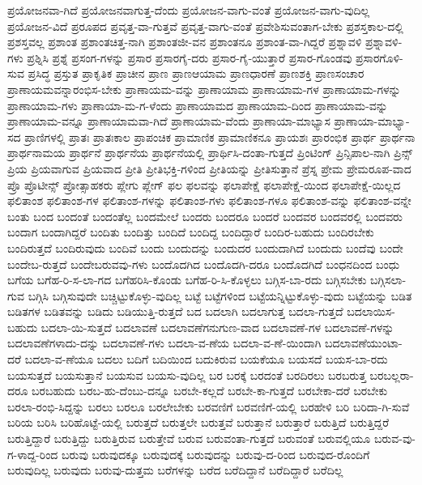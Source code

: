 {ಪ್ರಯೋಜನವಾ-ಗಿದೆ
ಪ್ರಯೋಜನವಾಗುತ್ತ-ದೆಂದು
ಪ್ರಯೋಜನ-ವಾಗು-ವಂತೆ
ಪ್ರಯೋಜನ-ವಾಗು-ವುದಿಲ್ಲ
ಪ್ರಯೋಜನ-ವಿದೆ
ಪ್ರರೂಪದ
ಪ್ರವೃತ್ತ-ವಾ-ಗುತ್ತವೆ
ಪ್ರವೃತ್ತ-ವಾಗು-ವಂತೆ
ಪ್ರವೇಶಿಸುವಂತಾಗ-ಬೇಕು
ಪ್ರಶಸ್ತಕಾಲ-ದಲ್ಲಿ
ಪ್ರಶಸ್ತವಲ್ಲ
ಪ್ರಶಾಂತ
ಪ್ರಶಾಂತಚಿತ್ತ-ನಾಗಿ
ಪ್ರಶಾಂತಜೀ-ವನ
ಪ್ರಶಾಂತನೂ
ಪ್ರಶಾಂತ-ವಾ-ಗಿದ್ದರೆ
ಪ್ರಶ್ನಾವಳಿ
ಪ್ರಶ್ನಾವಳಿ-ಗಳು
ಪ್ರಶ್ನಿಸಿ
ಪ್ರಶ್ನೆ
ಪ್ರಸಂಗ-ಗಳನ್ನು
ಪ್ರಸಾರ
ಪ್ರಸಾರಗೈ-ದರು
ಪ್ರಸಾರ-ಗೈ-ಯುತ್ತಾರೆ
ಪ್ರಸಾರ-ಗೊಂಡವು
ಪ್ರಸಾರಗೊಳಿ-ಸುವ
ಪ್ರಸಿದ್ಧ
ಪ್ರಸ್ತುತ
ಪ್ರಾಕೃತಿಕ
ಪ್ರಾಚೀನ
ಪ್ರಾಣ
ಪ್ರಾಣಆಯಾಮ
ಪ್ರಾಣಧಾರಣೆ
ಪ್ರಾಣಶಕ್ತಿ
ಪ್ರಾಣಸಂಚಾರ
ಪ್ರಾಣಾಯಮವನ್ನಾರಂಭಿಸ-ಬೇಕು
ಪ್ರಾಣಾಯಮ-ವನ್ನು
ಪ್ರಾಣಾಯಾಮ
ಪ್ರಾಣಾಯಾಮ-ಗಳ
ಪ್ರಾಣಾಯಾಮ-ಗಳನ್ನು
ಪ್ರಾಣಾಯಾಮ-ಗಳು
ಪ್ರಾಣಾಯಾ-ಮ-ಗ-ಳೆಂದು
ಪ್ರಾಣಾಯಾಮದ
ಪ್ರಾಣಾಯಾಮ-ದಿಂದ
ಪ್ರಾಣಾಯಾಮ-ವನ್ನು
ಪ್ರಾಣಾಯಾಮ-ವನ್ನೂ
ಪ್ರಾಣಾಯಾಮವಾ-ಗಿದೆ
ಪ್ರಾಣಾಯಾಮ-ವೆಂದು
ಪ್ರಾಣಾಯಾ-ಮಾಭ್ಯಾಸ
ಪ್ರಾಣಾಯಾ-ಮಾಭ್ಯಾ-ಸದ
ಪ್ರಾಣಿಗಳಲ್ಲಿ
ಪ್ರಾತಃ
ಪ್ರಾತಃಕಾಲ
ಪ್ರಾಪಂಚಿಕ
ಪ್ರಾಮಾಣಿಕ
ಪ್ರಾಮಾಣಿಕನೂ
ಪ್ರಾಯಶಃ
ಪ್ರಾರಂಭಿಕ
ಪ್ರಾರ್ಥ
ಪ್ರಾರ್ಥನಾ
ಪ್ರಾರ್ಥನಾಮಯ
ಪ್ರಾರ್ಥನೆ
ಪ್ರಾರ್ಥನೆಯ
ಪ್ರಾರ್ಥನೆಯಲ್ಲಿ
ಪ್ರಾರ್ಥಿಸಿ-ದಂತಾ-ಗುತ್ತದೆ
ಪ್ರಿಂಟಿಂಗ್
ಪ್ರಿನ್ಸಿಪಾಲ-ನಾಗಿ
ಪ್ರಿನ್ಸ್
ಪ್ರಿಯ
ಪ್ರಿಯವಾಗುವ
ಪ್ರಿಯವಾದ
ಪ್ರೀತಿ
ಪ್ರೀತಿಭಕ್ತಿ-ಗಳಿಂದ
ಪ್ರೀತಿಯನ್ನು
ಪ್ರೀತಿಸುತ್ತಾನೆ
ಪ್ರೆಸ್ನ
ಪ್ರೇಮ
ಪ್ರೇಮರೂಪ-ವಾದ
ಪ್ರೊ
ಪ್ರೊಟೀನ್ಸ್
ಪ್ರೋತ್ಸಾಹಕರು
ಪ್ಲೇಗು
ಪ್ಲೇಗ್
ಫಲ
ಫಲವನ್ನು
ಫಲಾಪೇಕ್ಷೆ
ಫಲಾಪೇಕ್ಷೆ-ಯಿಂದ
ಫಲಾಪೇಕ್ಷೆ-ಯಿಲ್ಲದ
ಫಲಿತಾಂಶ
ಫಲಿತಾಂಶ-ಗಳ
ಫಲಿತಾಂಶ-ಗಳನ್ನು
ಫಲಿತಾಂಶ-ಗಳು
ಫಲಿತಾಂಶ-ಗಳೂ
ಫಲಿತಾಂಶ-ವನ್ನು
ಫಲಿತಾಂಶ-ವನ್ನೇ
ಬಂತು
ಬಂದ
ಬಂದಂತೆ
ಬಂದಂತೆಲ್ಲ
ಬಂದಮೇಲೆ
ಬಂದರು
ಬಂದರೂ
ಬಂದರೆ
ಬಂದವರ
ಬಂದವರಲ್ಲಿ
ಬಂದವರು
ಬಂದಾಗ
ಬಂದಾಗಿದ್ದರೆ
ಬಂದಿತು
ಬಂದಿತ್ತು
ಬಂದಿದೆ
ಬಂದಿದ್ದ
ಬಂದಿದ್ದಾರೆ
ಬಂದಿರ-ಬಹುದು
ಬಂದಿರಬೇಕು
ಬಂದಿರುತ್ತದೆ
ಬಂದಿರುವುದು
ಬಂದಿವೆ
ಬಂದು
ಬಂದುದನ್ನು
ಬಂದುದರ
ಬಂದುದಾಗಿದೆ
ಬಂದುದು
ಬಂದೆವು
ಬಂದೇ
ಬಂದೇಬ-ರುತ್ತದೆ
ಬಂದೇಬರುವವು-ಗಳು
ಬಂದೊದಗಿದ
ಬಂದೊದಗಿ-ದರೂ
ಬಂದೊದಗಿದೆ
ಬಂಧನದಿಂದ
ಬಂಧು
ಬಗೆಯ
ಬಗೆಹ-ರಿ-ಸ-ಲಾ-ಗದ
ಬಗೆಹರಿಸಿ-ಕೊಂಡು
ಬಗೆಹ-ರಿ-ಸಿ-ಕೊಳ್ಳಲು
ಬಗ್ಗಿಸ-ಬಾ-ರದು
ಬಗ್ಗಿಸಬೇಕು
ಬಗ್ಗಿಸಲಾ-ಗುವ
ಬಗ್ಗಿಸಿ
ಬಗ್ಗಿಸುವುದೇ
ಬಚ್ಚಿಟ್ಟುಕೊಳ್ಳು-ವುದಿಲ್ಲ
ಬಟ್ಟೆ
ಬಟ್ಟೆಗಳಿಂದ
ಬಟ್ಟೆಯನ್ನಿಟ್ಟುಕೊಳ್ಳು-ವುದು
ಬಟ್ಟೆಯನ್ನು
ಬಡಿತ
ಬಡಿತಗಳ
ಬಡಿತವನ್ನು
ಬಡಿದು
ಬಡಿಯುತ್ತಿ-ರುತ್ತದೆ
ಬದ
ಬದಲಾಗಿ
ಬದಲಾಗುತ್ತ
ಬದಲಾ-ಗುತ್ತದೆ
ಬದಲಾಯಿಸ-ಬಹುದು
ಬದಲಾ-ಯಿ-ಸುತ್ತದೆ
ಬದಲಾವಣೆ
ಬದಲಾವಣೆಗನುಗುಣ-ವಾದ
ಬದಲಾವಣೆ-ಗಳ
ಬದಲಾವಣೆ-ಗಳನ್ನು
ಬದಲಾವಣೆಗಳಾದು-ದನ್ನು
ಬದಲಾವಣೆ-ಗಳು
ಬದಲಾ-ವ-ಣೆಯ
ಬದಲಾ-ವ-ಣೆ-ಯಿಂದಾಗಿ
ಬದಲಾವಣೆಯುಂಟಾ-ದರೆ
ಬದಲಾ-ವ-ಣೆಯೂ
ಬದಲು
ಬದಿಗೆ
ಬದಿಯಿಂದ
ಬದುಕಿರುವ
ಬಯಕೆಯೂ
ಬಯಸದೆ
ಬಯಸ-ಬಾ-ರದು
ಬಯಸುತ್ತದೆ
ಬಯಸುತ್ತಾನೆ
ಬಯಸುವ
ಬಯಸು-ವುದಿಲ್ಲ
ಬರ
ಬರಕ್ಕೆ
ಬರದಂತೆ
ಬರದಿರಲು
ಬರಬರುತ್ತ
ಬರಬಲ್ಲರಾ-ದರೂ
ಬರಬಹುದು
ಬರಬ-ಹು-ದೆಂಬು-ದನ್ನೂ
ಬರಬೇ-ಕಲ್ಲದೆ
ಬರಬೇ-ಕಾ-ಗುತ್ತದೆ
ಬರಬೇಕಾ-ದರೆ
ಬರಬೇಕು
ಬರಲಾ-ರಂಭಿ-ಸಿದ್ದನ್ನು
ಬರಲು
ಬರಲೂ
ಬರಲೇಬೇಕು
ಬರವಣಿಗೆ
ಬರವಣಿಗೆ-ಯಲ್ಲಿ
ಬರಹೇಳಿ
ಬರಿ
ಬರಿದಾ-ಗಿ-ಸುವೆ
ಬರಿಯ
ಬರಿಸಿ
ಬರಿಹೊಟ್ಟೆ-ಯಲ್ಲಿ
ಬರುತ್ತದೆ
ಬರುತ್ತಲೇ
ಬರುತ್ತವೆ
ಬರುತ್ತಾನೆ
ಬರುತ್ತಾರೆ
ಬರುತ್ತಿದೆ
ಬರುತ್ತಿದ್ದರೆ
ಬರುತ್ತಿದ್ದಾರೆ
ಬರುತ್ತಿದ್ದು
ಬರುತ್ತಿರುವ
ಬರುತ್ತೇವೆ
ಬರುವ
ಬರುವಂತಾ-ಗುತ್ತದೆ
ಬರುವಂತೆ
ಬರುವಲ್ಲಿಯೂ
ಬರುವ-ವು-ಗ-ಳಾದ್ದ-ರಿಂದ
ಬರುವು
ಬರುವುದಕ್ಕೂ
ಬರುವುದಕ್ಕೆ
ಬರುವುದನ್ನು
ಬರುವು-ದ-ರಿಂದ
ಬರುವುದ-ರೊಂದಿಗೆ
ಬರುವುದಿಲ್ಲ
ಬರುವುದು
ಬರುವು-ದುತ್ತಮ
ಬರೆಗಳನ್ನು
ಬರೆದ
ಬರೆದಿದ್ದಾನೆ
ಬರೆದಿದ್ದಾರೆ
ಬರೆದಿಲ್ಲ
}
